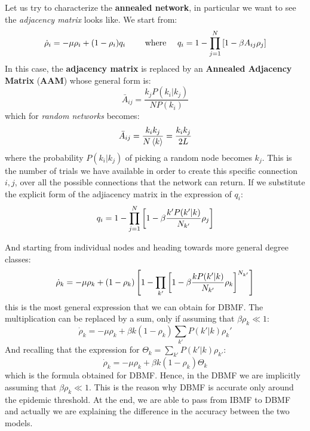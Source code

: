 \documentclass[../main/main.tex]{subfiles}
\begin{document}
Let us try to characterize the \textbf{annealed network}, in particular we want to see the \textit{adjacency matrix} looks like.
We start from:
\begin{equation*}
  \dot{\rho }_i = - \mu \rho _i + (1 - \rho _i) q_i \qquad \text{ where } \quad q_i = 1- \prod_{j=1}^{N} \qty[ 1 - \beta A_{ij} \rho _j]
\end{equation*}
In this case, the \textbf{adjacency matrix} is replaced by an \textbf{Annealed Adjacency Matrix} (\textbf{AAM}) whose general form is:
\begin{equation}
  \bar{A}_{ij} = \frac{k_j P(k_i|k_j)}{N P (k_i)}
\end{equation}
which for \emph{random networks} becomes:
\begin{equation*}
  \bar{A}_{ij} = \frac{k_i k_j}{N \expval{k} } = \frac{k_i k_j}{2 L}
\end{equation*}
where the probability  \(  P(k_i|k_j) \) of picking a random node becomes \( k_j \). This is the number of trials we have available in order to create this specific connection  \( i,j \), over all the possible connections that the network can return.
If we substitute the explicit form of the adjiacency matrix in the expression of \( q_i \):
\begin{equation*}
  q_i = 1 - \prod_{j=1}^{N} \qty[1 - \beta \frac{k' P(k'|k)}{N_{k'}} \rho _j]
\end{equation*}


And starting from individual nodes and heading towards more general degree classes:
\begin{equation*}
  \dot{\rho }_k = - \mu \rho _k + (1- \rho _k)\left[ 1 - \prod_{k'} \qty[1 - \beta \frac{k P(k'|k)}{N_{k'}} \rho _k]^{N_{k'}} \right]
\end{equation*}
this is the most general expression that we can obtain for DBMF.
The multiplication can be replaced by a sum, only if assuming that \( \beta \rho _k \ll 1 \):
\begin{equation*}
  \dot{\rho }_ k = - \mu \rho_k + \beta k (1-\rho_k) \sum_{k'}P(k'|k)\rho_k'
\end{equation*}
And recalling that the expression for $\Theta_k = \sum_{k'}P(k'|k)\rho_{k'}$:
\begin{equation*}
   \dot{\rho }_ k = - \mu \rho_k + \beta k (1-\rho_k) \Theta_k
\end{equation*}
which is the formula obtained for DBMF. Hence, in the DBMF we are implicitly assuming that  \( \beta \rho _k \ll 1 \). This is the reason why DBMF is accurate only around the epidemic threshold. At the end, we are able to pass from IBMF to DBMF and actually we are explaining the difference in the accuracy between the two models.
\end{document}
